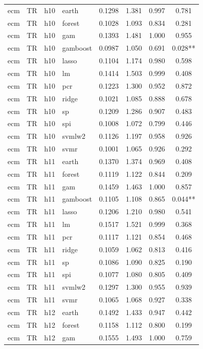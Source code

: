 \begin{ThreePartTable}
\begin{longtable}[t]{llclcccc}
\addlinespace
ecm & TR & h10 & earth & 0.1298 & 1.381 & 0.997 & 0.781\\
ecm & TR & h10 & forest & 0.1028 & 1.093 & 0.834 & 0.281\\
ecm & TR & h10 & gam & 0.1393 & 1.481 & 1.000 & 0.955\\
ecm & TR & h10 & gamboost & 0.0987 & 1.050 & 0.691 & 0.028**\\
ecm & TR & h10 & lasso & 0.1104 & 1.174 & 0.980 & 0.598\\
ecm & TR & h10 & lm & 0.1414 & 1.503 & 0.999 & 0.408\\
ecm & TR & h10 & pcr & 0.1223 & 1.300 & 0.952 & 0.872\\
ecm & TR & h10 & ridge & 0.1021 & 1.085 & 0.888 & 0.678\\
ecm & TR & h10 & sp & 0.1209 & 1.286 & 0.907 & 0.483\\
ecm & TR & h10 & spi & 0.1008 & 1.072 & 0.799 & 0.446\\
ecm & TR & h10 & svmlw2 & 0.1126 & 1.197 & 0.958 & 0.926\\
ecm & TR & h10 & svmr & 0.1001 & 1.065 & 0.926 & 0.292\\
\addlinespace
ecm & TR & h11 & earth & 0.1370 & 1.374 & 0.969 & 0.408\\
ecm & TR & h11 & forest & 0.1119 & 1.122 & 0.844 & 0.209\\
ecm & TR & h11 & gam & 0.1459 & 1.463 & 1.000 & 0.857\\
ecm & TR & h11 & gamboost & 0.1105 & 1.108 & 0.865 & 0.044**\\
ecm & TR & h11 & lasso & 0.1206 & 1.210 & 0.980 & 0.541\\
ecm & TR & h11 & lm & 0.1517 & 1.521 & 0.999 & 0.368\\
ecm & TR & h11 & pcr & 0.1117 & 1.121 & 0.854 & 0.468\\
ecm & TR & h11 & ridge & 0.1059 & 1.062 & 0.813 & 0.416\\
ecm & TR & h11 & sp & 0.1086 & 1.090 & 0.825 & 0.190\\
ecm & TR & h11 & spi & 0.1077 & 1.080 & 0.805 & 0.409\\
ecm & TR & h11 & svmlw2 & 0.1297 & 1.300 & 0.955 & 0.939\\
ecm & TR & h11 & svmr & 0.1065 & 1.068 & 0.927 & 0.338\\
\addlinespace
ecm & TR & h12 & earth & 0.1492 & 1.433 & 0.947 & 0.442\\
ecm & TR & h12 & forest & 0.1158 & 1.112 & 0.800 & 0.199\\
ecm & TR & h12 & gam & 0.1555 & 1.493 & 1.000 & 0.759\\

\end{longtable}
\end{ThreePartTable}
